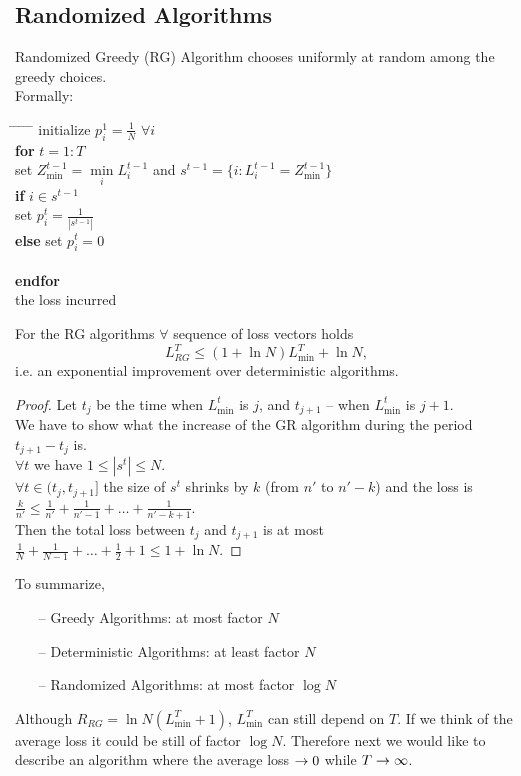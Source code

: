 \subsection{Randomized Algorithms}
\begin{definition}
Randomized Greedy (RG) Algorithm chooses uniformly at random among the greedy choices.\\
Formally:
\begin{tabbing}
\hspace*{.25in} \= \hspace*{.25in} \= \hspace*{.25in} \= \hspace*{.25in} \= \hspace*{.25in} \=\kill
\> initialize $p^1_i=\frac{1}{N}$ $\forall i$\\
\> {\bf for} $t=1:T$\\
\>\> set $Z^{t-1}_{\min}=\min\limits_{i}L^{t-1}_i$ and $s^{t-1}=\{i:L^{t-1}_i=Z^{t-1}_{\min}\}$\\
\>\> {\bf if} $i\in s^{t-1}$\\
\>\>\> set $p^t_i=\frac{1}{|s^{t-1}|}$\\
\>\> {\bf else} set $p^t_i=0$\\
\> \\
\> {\bf endfor}\\
 the loss incurred
\end{tabbing}
\end{definition}
\begin{theorem}
For the RG algorithms $\forall$ sequence of loss vectors holds
$$
L^T_{RG}\leqslant(1+\ln N)L^T_{\min}+\ln N,
$$
i.e. an exponential improvement over deterministic algorithms.
\end{theorem}
\begin{proof}
Let $t_j$ be the time when $L^t_{\min}$ is $j$, and $t_{j+1}$ -- when $L^t_{\min}$ is $j+1$.\\
We have to show what the increase of the GR algorithm during the period $t_{j+1}-t_j$ is.\\
$\forall t$ we have $1\leqslant|s^t|\leqslant N$.\\
$\forall t\in(t_{j},t_{j+1}]$ the size of $s^t$ shrinks by $k$ (from $n'$ to $n'-k$) and the loss is $\frac{k}{n'}\leqslant\frac{1}{n'}+\frac{1}{n'-1}+\ldots+\frac{1}{n'-k+1}$.\\
Then the total loss between $t_j$ and $t_{j+1}$ is at most $\frac{1}{N}+\frac{1}{N-1}+\ldots+\frac{1}{2}+1\leqslant 1+\ln N$.
\end{proof}
To summarize,
\begin{itemize}
\item[--] Greedy Algorithms: at most factor $N$
\item[--] Deterministic Algorithms: at least factor $N$
\item[--] Randomized Algorithms: at most factor $\log N$
\end{itemize}
Although $R_{RG}=\ln N(L^T_{\min}+1)$, $L^T_{\min}$ can still depend on $T$.
If we think of the average loss it could be still of factor $\log N$.
Therefore next we would like to describe an algorithm where the average loss $\rightarrow 0$ while $T\rightarrow\infty$.


